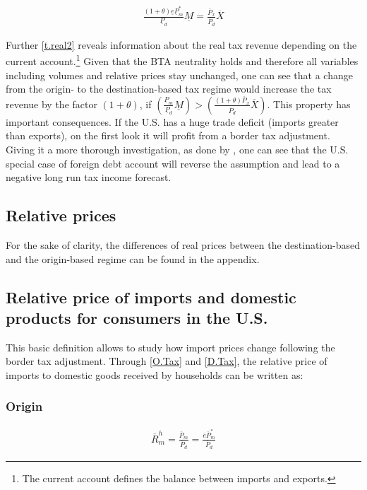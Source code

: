 \begin{equation}
    \begin{aligned}
        \frac{(1+\theta)\underline e \underline P_m^*}{\underline P_d}\underline M = \frac{\overline P_x}{\overline P_d} \overline X
    \end{aligned}
\end{equation}


Further \eqref{t.real2} reveals information about the real tax revenue depending on the current account.\footnote{The current account defines the balance between imports and exports. } Given that the BTA neutrality holds and therefore all variables including volumes and relative prices stay unchanged, one can see that a change from the origin- to the destination-based tax regime would increase the tax revenue by the factor $(1+\theta)$, if $\left(\frac{\underline P_m}{\underline P_d} \underline M\right) > \left(\frac{ \left( 1+\theta \right) \overline P_x}{\overline P_d}\overline X\right) $. This property has important consequences. If the U.S. has a huge trade deficit (imports greater than exports), on the first look it will profit from a border tax adjustment. Giving it a more thorough investigation, as done by \cite{Feldstein&Krugman}, one can see that the U.S. special case of foreign debt account will reverse the assumption and lead to a negative long run tax income forecast.



\subsection*{Relative prices}
For the sake of clarity, the differences of real prices between the destination-based and the origin-based regime can be found in the appendix. 

\subsection*{Relative price of imports and domestic products for consumers in the U.S.}
This basic definition allows to study how import prices change following the border tax adjustment. Through \eqref{O.Tax} and \eqref{D.Tax}, the relative price of imports to domestic goods received by households can be written as:
\subsubsection*{Origin}
\begin{equation}\label{mcon.o}
\begin{aligned}
\overline R^h_m = \frac{\overline P_m}{\overline P_d} = \frac{\overline e \overline P^*_m}{\overline P_d}
\end{aligned} 
\end{equation}

